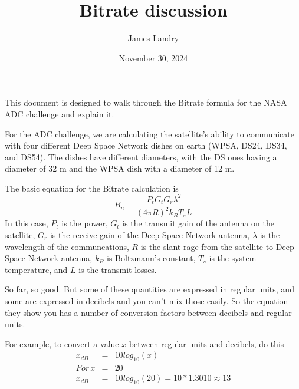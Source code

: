 \documentclass[11pt,twoside]{article}
\begin{document}
\title{Bitrate discussion}
\author{James Landry}
\date{November 30, 2024}
\maketitle

This document is designed to walk through the Bitrate formula for the NASA ADC challenge and explain it.

For the ADC challenge, we are calculating the satellite's ability to communicate with four different Deep Space Network dishes on earth (WPSA, DS24, DS34, and DS54). The dishes have different diameters, with the DS ones having a diameter of 32 m and the WPSA dish with a diameter of 12 m.

The basic equation for the Bitrate calculation is
\begin{equation}
    B_n = \frac{P_t G_t G_r \lambda^2}{(4 \pi R)^2 k_B T_s L}
\end{equation}
In this case, $P_t$ is the power, $G_t$ is the transmit gain of the antenna on the satellite, $G_r$ is the receive gain of the Deep Space Network antenna, $\lambda$ is the wavelength of the communcations, $R$ is the slant rage from the satellite to Deep Space Network antenna, $k_B$ is Boltzmann's constant, $T_s$ is the system temperature, and $L$ is the transmit losses.

So far, so good. But some of these quantities are expressed in regular units, and some are expressed in decibels and you can't mix those easily. So the equation they show you has a number of conversion factors between decibels and regular units.

For example, to convert a value $x$ between regular units and decibels, do this
\begin{eqnarray}
    x_{dB} & = & 10 log_{10}(x) \\
    For \, x & = & 20 \\
    x_{dB} & = & 10 log_{10}(20) = 10 * 1.3010 \approx 13
\end{eqnarray}
    
\end{document}
